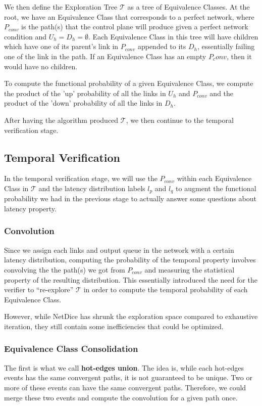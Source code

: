 \documentclass[10pt,sigconf,letterpaper,anonymous,nonacm]{acmart}
\begin{document}
We then define the Exploration Tree $\mathcal{T}$ as a tree of Equivalence Classes.
At the root, we have an Equivalence Class that corresponds to a perfect network, where $P_{conv}$ 
is the path(s) that the control plane will produce given a perfect network condition and 
$U_h = D_h = \emptyset$.
Each Equivalence Class in this tree will have children which have one of its parent's link in 
$P_{conv}$ appended to its $D_h$, essentially failing one of the link in the path.
If an Equivalence Class has an empty $P_conv$, then it would have no children.

To compute the functional probability of a given Equivalence Class, we compute the product 
of the 'up' probability of all the links in $U_h$ and $P_{conv}$ and the product of the 'down'
probability of all the links in $D_h$.

After having the algorithm produced $\mathcal{T}$, we then continue to the temporal verification 
stage.

\subsection{Temporal Verification}
In the temporal verification stage, we will use the $P_{conv}$ within each Equivalence Class in 
$\mathcal{T}$ and the latency distribution labels $l_p$ and $l_q$ to augment the functional 
probability we had in the previous stage to actually answer some questions about latency property.

\subsubsection{Convolution}
Since we assign each links and output queue in the network with a certain latency distribution, 
computing the probability of the temporal property involves convolving the the path(s) we got from 
$P_{conv}$ and measuring the statistical property of the resulting distribution.
This essentially introduced the need for the verifier to ``re-explore'' $\mathcal{T}$ in order to 
compute the temporal probability of each Equivalence Class.


However, while NetDice has shrunk the exploration space compared to exhaustive iteration, they still 
contain some inefficiencies that could be optimized. 

\subsubsection{Equivalence Class Consolidation}
The first is what we call \textbf{hot-edges union}. 
The idea is, while each hot-edges events has the same convergent paths, it is not guaranteed to be 
unique. 
Two or more of these events can have the same convergent paths.
Therefore, we could merge these two events and compute the convolution for a given path once.
\end{document}
